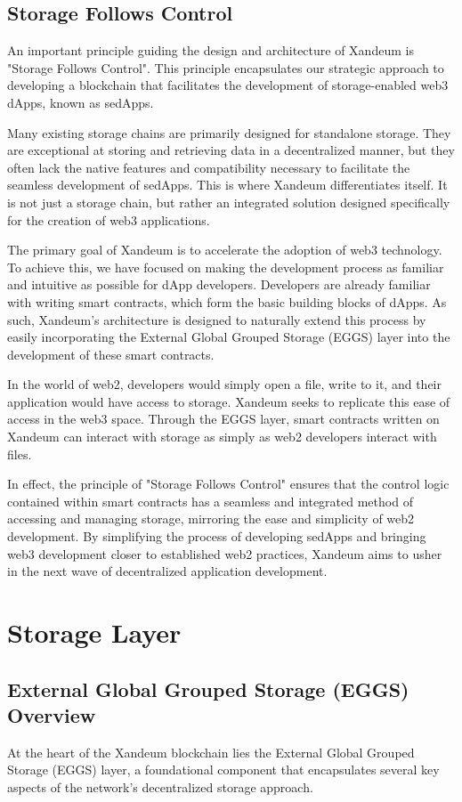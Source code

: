 \documentclass[11pt]{article}   	%
\begin{document}
\subsection{Storage Follows Control}
An important principle guiding the design and architecture of Xandeum is "Storage Follows Control". This principle encapsulates our strategic approach to developing a blockchain that facilitates the development of storage-enabled web3 dApps, known as sedApps.

Many existing storage chains are primarily designed for standalone storage. They are exceptional at storing and retrieving data in a decentralized manner, but they often lack the native features and compatibility necessary to facilitate the seamless development of sedApps. This is where Xandeum differentiates itself. It is not just a storage chain, but rather an integrated solution designed specifically for the creation of web3 applications.

The primary goal of Xandeum is to accelerate the adoption of web3 technology. To achieve this, we have focused on making the development process as familiar and intuitive as possible for dApp developers. Developers are already familiar with writing smart contracts, which form the basic building blocks of dApps. As such, Xandeum's architecture is designed to naturally extend this process by easily incorporating the External Global Grouped Storage (EGGS) layer into the development of these smart contracts.

In the world of web2, developers would simply open a file, write to it, and their application would have access to storage. Xandeum seeks to replicate this ease of access in the web3 space. Through the EGGS layer, smart contracts written on Xandeum can interact with storage as simply as web2 developers interact with files.

In effect, the principle of "Storage Follows Control" ensures that the control logic contained within smart contracts has a seamless and integrated method of accessing and managing storage, mirroring the ease and simplicity of web2 development. By simplifying the process of developing sedApps and bringing web3 development closer to established web2 practices, Xandeum aims to usher in the next wave of decentralized application development.

\section{Storage Layer}
\subsection{External Global Grouped Storage (EGGS) Overview}
At the heart of the Xandeum blockchain lies the External Global Grouped Storage (EGGS) layer, a foundational component that encapsulates several key aspects of the network's decentralized storage approach.
\end{document}
